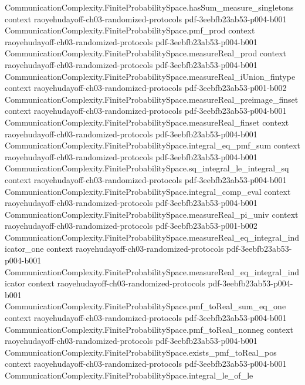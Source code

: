 \begin{theorem}
  {CommunicationComplexity.FiniteProbabilitySpace.hasSum_measure_singletons}
  {context}
  {raoyehudayoff-ch03-randomized-protocols}
  {pdf-3eebfb23ab53-p004-b001}
\proofstep
  {CommunicationComplexity.FiniteProbabilitySpace.pmf_prod}
  {context}
  {raoyehudayoff-ch03-randomized-protocols}
  {pdf-3eebfb23ab53-p004-b001}
\proofstep
  {CommunicationComplexity.FiniteProbabilitySpace.measureReal_prod}
  {context}
  {raoyehudayoff-ch03-randomized-protocols}
  {pdf-3eebfb23ab53-p004-b001}
\proofstep
  {CommunicationComplexity.FiniteProbabilitySpace.measureReal_iUnion_fintype}
  {context}
  {raoyehudayoff-ch03-randomized-protocols}
  {pdf-3eebfb23ab53-p001-b002}
\proofstep
  {CommunicationComplexity.FiniteProbabilitySpace.measureReal_preimage_finset}
  {context}
  {raoyehudayoff-ch03-randomized-protocols}
  {pdf-3eebfb23ab53-p004-b001}
\proofstep
  {CommunicationComplexity.FiniteProbabilitySpace.measureReal_finset}
  {context}
  {raoyehudayoff-ch03-randomized-protocols}
  {pdf-3eebfb23ab53-p004-b001}
\proofstep
  {CommunicationComplexity.FiniteProbabilitySpace.integral_eq_pmf_sum}
  {context}
  {raoyehudayoff-ch03-randomized-protocols}
  {pdf-3eebfb23ab53-p004-b001}
\proofstep
  {CommunicationComplexity.FiniteProbabilitySpace.sq_integral_le_integral_sq}
  {context}
  {raoyehudayoff-ch03-randomized-protocols}
  {pdf-3eebfb23ab53-p004-b001}
\proofstep
  {CommunicationComplexity.FiniteProbabilitySpace.integral_comp_eval}
  {context}
  {raoyehudayoff-ch03-randomized-protocols}
  {pdf-3eebfb23ab53-p004-b001}
\proofstep
  {CommunicationComplexity.FiniteProbabilitySpace.measureReal_pi_univ}
  {context}
  {raoyehudayoff-ch03-randomized-protocols}
  {pdf-3eebfb23ab53-p001-b002}
\proofstep
  {CommunicationComplexity.FiniteProbabilitySpace.measureReal_eq_integral_indicator_one}
  {context}
  {raoyehudayoff-ch03-randomized-protocols}
  {pdf-3eebfb23ab53-p004-b001}
\proofstep
  {CommunicationComplexity.FiniteProbabilitySpace.measureReal_eq_integral_indicator}
  {context}
  {raoyehudayoff-ch03-randomized-protocols}
  {pdf-3eebfb23ab53-p004-b001}
\proofstep
  {CommunicationComplexity.FiniteProbabilitySpace.pmf_toReal_sum_eq_one}
  {context}
  {raoyehudayoff-ch03-randomized-protocols}
  {pdf-3eebfb23ab53-p004-b001}
\proofstep
  {CommunicationComplexity.FiniteProbabilitySpace.pmf_toReal_nonneg}
  {context}
  {raoyehudayoff-ch03-randomized-protocols}
  {pdf-3eebfb23ab53-p004-b001}
\proofstep
  {CommunicationComplexity.FiniteProbabilitySpace.exists_pmf_toReal_pos}
  {context}
  {raoyehudayoff-ch03-randomized-protocols}
  {pdf-3eebfb23ab53-p004-b001}
\proofstep
  {CommunicationComplexity.FiniteProbabilitySpace.integral_le_of_le}

\end{theorem}
